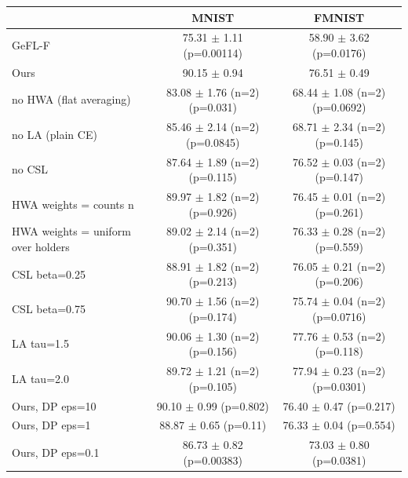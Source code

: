 \begin{tabular}{lcc}
\toprule
 & MNIST & FMNIST \\
\midrule
GeFL-F & 75.31 $\pm$ 1.11 (p=0.00114) & 58.90 $\pm$ 3.62 (p=0.0176) \\
Ours & 90.15 $\pm$ 0.94 & 76.51 $\pm$ 0.49 \\
no HWA (flat averaging) & 83.08 $\pm$ 1.76 (n=2) (p=0.031) & 68.44 $\pm$ 1.08 (n=2) (p=0.0692) \\
no LA (plain CE) & 85.46 $\pm$ 2.14 (n=2) (p=0.0845) & 68.71 $\pm$ 2.34 (n=2) (p=0.145) \\
no CSL & 87.64 $\pm$ 1.89 (n=2) (p=0.115) & 76.52 $\pm$ 0.03 (n=2) (p=0.147) \\
HWA weights = counts n & 89.97 $\pm$ 1.82 (n=2) (p=0.926) & 76.45 $\pm$ 0.01 (n=2) (p=0.261) \\
HWA weights = uniform over holders & 89.02 $\pm$ 2.14 (n=2) (p=0.351) & 76.33 $\pm$ 0.28 (n=2) (p=0.559) \\
CSL beta=0.25 & 88.91 $\pm$ 1.82 (n=2) (p=0.213) & 76.05 $\pm$ 0.21 (n=2) (p=0.206) \\
CSL beta=0.75 & 90.70 $\pm$ 1.56 (n=2) (p=0.174) & 75.74 $\pm$ 0.04 (n=2) (p=0.0716) \\
LA tau=1.5 & 90.06 $\pm$ 1.30 (n=2) (p=0.156) & 77.76 $\pm$ 0.53 (n=2) (p=0.118) \\
LA tau=2.0 & 89.72 $\pm$ 1.21 (n=2) (p=0.105) & 77.94 $\pm$ 0.23 (n=2) (p=0.0301) \\
Ours, DP eps=10 & 90.10 $\pm$ 0.99 (p=0.802) & 76.40 $\pm$ 0.47 (p=0.217) \\
Ours, DP eps=1 & 88.87 $\pm$ 0.65 (p=0.11) & 76.33 $\pm$ 0.04 (p=0.554) \\
Ours, DP eps=0.1 & 86.73 $\pm$ 0.82 (p=0.00383) & 73.03 $\pm$ 0.80 (p=0.0381) \\
\bottomrule
\end{tabular}
